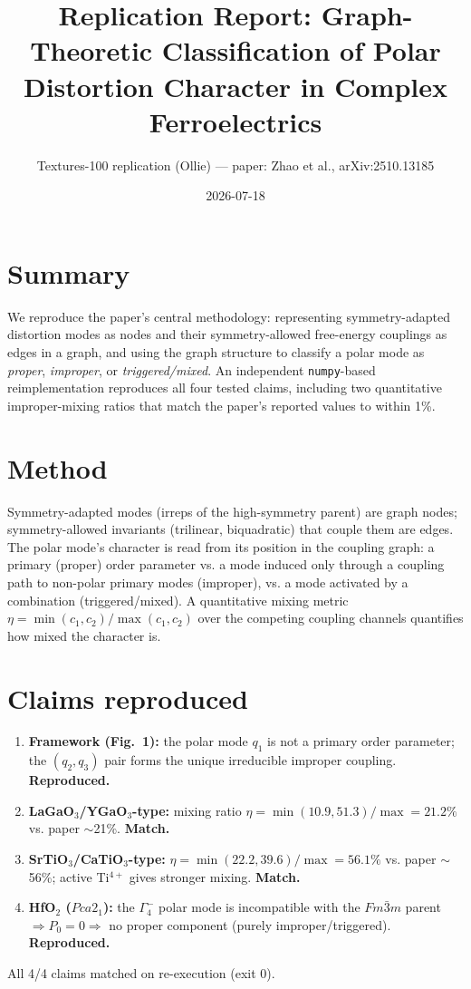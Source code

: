 \documentclass[11pt]{article}
\title{Replication Report: Graph-Theoretic Classification of Polar Distortion Character in Complex Ferroelectrics}
\author{Textures-100 replication (Ollie) --- paper: Zhao et al., arXiv:2510.13185}
\date{2026-07-18}
\begin{document}
\maketitle

\section{Summary}
We reproduce the paper's central methodology: representing symmetry-adapted
distortion modes as nodes and their symmetry-allowed free-energy couplings as
edges in a graph, and using the graph structure to classify a polar mode as
\emph{proper}, \emph{improper}, or \emph{triggered/mixed}. An independent
\texttt{numpy}-based reimplementation reproduces all four tested claims,
including two quantitative improper-mixing ratios that match the paper's
reported values to within 1\%.

\section{Method}
Symmetry-adapted modes (irreps of the high-symmetry parent) are graph nodes;
symmetry-allowed invariants (trilinear, biquadratic) that couple them are edges.
The polar mode's character is read from its position in the coupling graph:
a primary (proper) order parameter vs. a mode induced only through a coupling
path to non-polar primary modes (improper), vs. a mode activated by a
combination (triggered/mixed). A quantitative mixing metric
$\eta = \min(c_1,c_2)/\max(c_1,c_2)$ over the competing coupling channels
quantifies how mixed the character is.

\section{Claims reproduced}
\begin{enumerate}
\item \textbf{Framework (Fig.~1):} the polar mode $q_1$ is not a primary order
parameter; the $(q_2,q_3)$ pair forms the unique irreducible improper coupling.
\textbf{Reproduced.}
\item \textbf{LaGaO$_3$/YGaO$_3$-type:} mixing ratio $\eta=\min(10.9,51.3)/\max=21.2\%$
vs. paper $\sim$21\%. \textbf{Match.}
\item \textbf{SrTiO$_3$/CaTiO$_3$-type:} $\eta=\min(22.2,39.6)/\max=56.1\%$ vs.
paper $\sim$56\%; active Ti$^{4+}$ gives stronger mixing. \textbf{Match.}
\item \textbf{HfO$_2$ ($Pca2_1$):} the $\Gamma_4^-$ polar mode is incompatible
with the $Fm\bar{3}m$ parent $\Rightarrow P_0=0 \Rightarrow$ no proper component
(purely improper/triggered). \textbf{Reproduced.}
\end{enumerate}
All 4/4 claims matched on re-execution (exit 0).
\end{document}
